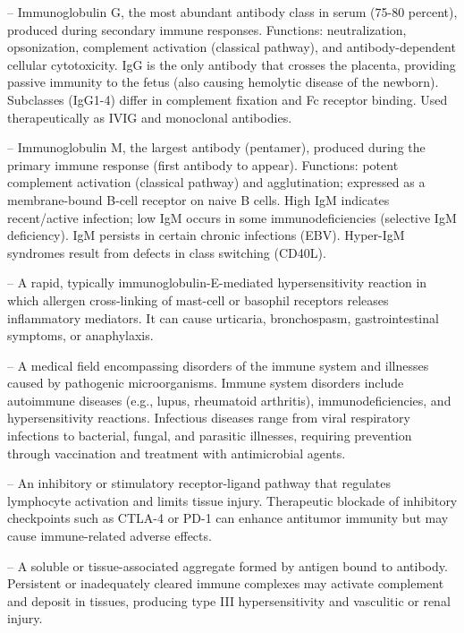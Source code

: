 -- Immunoglobulin G, the most abundant antibody class in serum (75-80 percent), produced during secondary immune responses. Functions: neutralization, opsonization, complement activation (classical pathway), and antibody-dependent cellular cytotoxicity. IgG is the only antibody that crosses the placenta, providing passive immunity to the fetus (also causing hemolytic disease of the newborn). Subclasses (IgG1-4) differ in complement fixation and Fc receptor binding. Used therapeutically as IVIG and monoclonal antibodies.

-- Immunoglobulin M, the largest antibody (pentamer), produced during the primary immune response (first antibody to appear). Functions: potent complement activation (classical pathway) and agglutination; expressed as a membrane-bound B-cell receptor on naive B cells. High IgM indicates recent/active infection; low IgM occurs in some immunodeficiencies (selective IgM deficiency). IgM persists in certain chronic infections (EBV). Hyper-IgM syndromes result from defects in class switching (CD40L).

-- A rapid, typically immunoglobulin-E-mediated hypersensitivity reaction in which allergen cross-linking of mast-cell or basophil receptors releases inflammatory mediators. It can cause urticaria, bronchospasm, gastrointestinal symptoms, or anaphylaxis.

-- A medical field encompassing disorders of the immune system and illnesses caused by pathogenic microorganisms. Immune system disorders include autoimmune diseases (e.g., lupus, rheumatoid arthritis), immunodeficiencies, and hypersensitivity reactions. Infectious diseases range from viral respiratory infections to bacterial, fungal, and parasitic illnesses, requiring prevention through vaccination and treatment with antimicrobial agents.

-- An inhibitory or stimulatory receptor-ligand pathway that regulates lymphocyte activation and limits tissue injury. Therapeutic blockade of inhibitory checkpoints such as CTLA-4 or PD-1 can enhance antitumor immunity but may cause immune-related adverse effects.

-- A soluble or tissue-associated aggregate formed by antigen bound to antibody. Persistent or inadequately cleared immune complexes may activate complement and deposit in tissues, producing type III hypersensitivity and vasculitic or renal injury.

